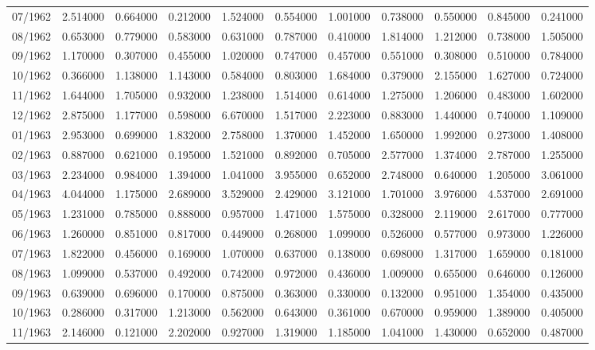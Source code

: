 \begin{tabular}{lrrrrrrrrrr}
07/1962 & 2.514000 & 0.664000 & 0.212000 & 1.524000 & 0.554000 & 1.001000 & 0.738000 & 0.550000 & 0.845000 & 0.241000 \\
08/1962 & 0.653000 & 0.779000 & 0.583000 & 0.631000 & 0.787000 & 0.410000 & 1.814000 & 1.212000 & 0.738000 & 1.505000 \\
09/1962 & 1.170000 & 0.307000 & 0.455000 & 1.020000 & 0.747000 & 0.457000 & 0.551000 & 0.308000 & 0.510000 & 0.784000 \\
10/1962 & 0.366000 & 1.138000 & 1.143000 & 0.584000 & 0.803000 & 1.684000 & 0.379000 & 2.155000 & 1.627000 & 0.724000 \\
11/1962 & 1.644000 & 1.705000 & 0.932000 & 1.238000 & 1.514000 & 0.614000 & 1.275000 & 1.206000 & 0.483000 & 1.602000 \\
12/1962 & 2.875000 & 1.177000 & 0.598000 & 6.670000 & 1.517000 & 2.223000 & 0.883000 & 1.440000 & 0.740000 & 1.109000 \\
01/1963 & 2.953000 & 0.699000 & 1.832000 & 2.758000 & 1.370000 & 1.452000 & 1.650000 & 1.992000 & 0.273000 & 1.408000 \\
02/1963 & 0.887000 & 0.621000 & 0.195000 & 1.521000 & 0.892000 & 0.705000 & 2.577000 & 1.374000 & 2.787000 & 1.255000 \\
03/1963 & 2.234000 & 0.984000 & 1.394000 & 1.041000 & 3.955000 & 0.652000 & 2.748000 & 0.640000 & 1.205000 & 3.061000 \\
04/1963 & 4.044000 & 1.175000 & 2.689000 & 3.529000 & 2.429000 & 3.121000 & 1.701000 & 3.976000 & 4.537000 & 2.691000 \\
05/1963 & 1.231000 & 0.785000 & 0.888000 & 0.957000 & 1.471000 & 1.575000 & 0.328000 & 2.119000 & 2.617000 & 0.777000 \\
06/1963 & 1.260000 & 0.851000 & 0.817000 & 0.449000 & 0.268000 & 1.099000 & 0.526000 & 0.577000 & 0.973000 & 1.226000 \\
07/1963 & 1.822000 & 0.456000 & 0.169000 & 1.070000 & 0.637000 & 0.138000 & 0.698000 & 1.317000 & 1.659000 & 0.181000 \\
08/1963 & 1.099000 & 0.537000 & 0.492000 & 0.742000 & 0.972000 & 0.436000 & 1.009000 & 0.655000 & 0.646000 & 0.126000 \\
09/1963 & 0.639000 & 0.696000 & 0.170000 & 0.875000 & 0.363000 & 0.330000 & 0.132000 & 0.951000 & 1.354000 & 0.435000 \\
10/1963 & 0.286000 & 0.317000 & 1.213000 & 0.562000 & 0.643000 & 0.361000 & 0.670000 & 0.959000 & 1.389000 & 0.405000 \\
11/1963 & 2.146000 & 0.121000 & 2.202000 & 0.927000 & 1.319000 & 1.185000 & 1.041000 & 1.430000 & 0.652000 & 0.487000 \\

\end{tabular}

